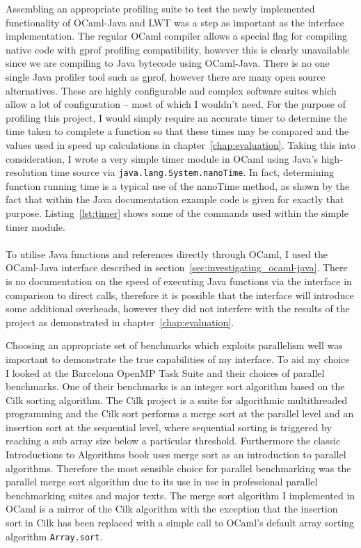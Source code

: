 \documentclass[12pt,twoside,notitlepage]{report}
\begin{document}
Assembling an appropriate profiling suite to test the newly implemented functionality of OCaml-Java and LWT was a step as important as the interface implementation. The regular OCaml compiler allows a special flag for compiling native code with gprof
profiling compatibility\cite{leroy2013}, however this is clearly unavailable since we are compiling to Java bytecode using OCaml-Java. There is no one single Java profiler tool such as gprof, however there are many open source
alternatives. These are highly configurable and complex software suites which allow a lot of configuration -- most of which I wouldn't need. For the purpose of profiling this project, I would simply require an accurate timer to
determine the time taken to complete a function so that these times may be compared and the values used in speed up calculations in chapter~\ref{chap:evaluation}. Taking this into consideration, I wrote a very simple timer module in
OCaml using Java's high-resolution time source via {\tt java.lang.System.nanoTime}. In fact, determining function running time is a typical use of the nanoTime method, as shown by the fact that within the Java documentation example
code is given for exactly that purpose. Listing~\ref{lst:timer} shows some of the commands used within the simple timer module.
\hfill\\

\hfill\\
To utilise Java functions and references directly through OCaml, I used the OCaml-Java interface described in section~\ref{sec:investigating_ocaml-java}. There is no documentation on the speed of executing Java functions via the interface in
comparison to direct calls, therefore it is possible that the interface will introduce some additional overheads, however they did not interfere with the results of the project as demonstrated in chapter~\ref{chap:evaluation}.

%
%
Choosing an appropriate set of benchmarks which exploits parallelism well was important to demonstrate the true capabilities of my interface. To aid my choice I looked at the Barcelona OpenMP Task Suite and their choices of parallel
benchmarks. One of their benchmarks is an integer sort algorithm based on the Cilk sorting algorithm. The Cilk project is a suite for algorithmic multithreaded programming and the Cilk sort performs a merge sort at the parallel level
and an insertion sort at the sequential level, where sequential sorting is triggered by reaching a sub array size below a particular threshold. Furthermore the classic Introductions to Algorithms book \cite{cormen2009} uses merge sort
as an introduction to parallel algorithms. Therefore the most sensible choice for parallel benchmarking was the parallel merge sort algorithm due to its use in use in professional parallel benchmarking suites and major texts. The merge sort algorithm
I implemented in OCaml is a mirror of the Cilk algorithm with the exception that the insertion sort in Cilk has been replaced with a simple call to OCaml's default array sorting algorithm {\tt Array.sort}.
\end{document}
